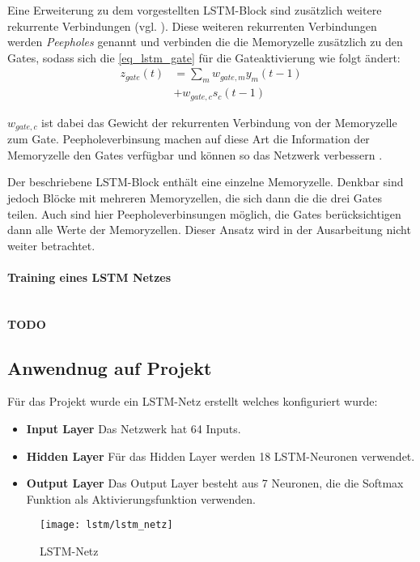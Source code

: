 Eine Erweiterung zu dem vorgestellten \ac{LSTM}-Block sind zusätzlich weitere
rekurrente Verbindungen (vgl. \cite{Gers2002b}). Diese weiteren rekurrenten
Verbindungen werden \textit{Peepholes} genannt und verbinden die die Memoryzelle
zusätzlich zu den Gates, sodass sich die \autoref{eq_lstm_gate} für die Gateaktivierung
wie folgt ändert:
\begin{equation}
\label{eq_lstm_gate_peephole}
\begin{split}
z_{gate}(t) &= \sum \limits_{m} w_{gate,m}y_m(t-1) \\
			&+ w_{gate,c} s_c(t-1)
\end{split}
\end{equation}

$w_{gate,c}$ ist dabei das Gewicht der rekurrenten Verbindung von der
Memoryzelle zum Gate. Peepholeverbinsung machen auf diese Art die Information
der Memoryzelle den Gates verfügbar und können so das Netzwerk verbessern
\cite{Gers2002b}. 

Der beschriebene \ac{LSTM}-Block enthält eine einzelne Memoryzelle. Denkbar sind
jedoch Blöcke mit mehreren Memoryzellen, die sich dann die die drei Gates
teilen. Auch sind hier Peepholeverbinsungen möglich, die Gates berücksichtigen
dann alle Werte der Memoryzellen. Dieser Ansatz wird in der Ausarbeitung nicht
weiter betrachtet. 

\paragraph{Training eines \ac{LSTM} Netzes}\\
\textbf{TODO}

\subsection{Anwendnug auf Projekt}
Für das Projekt wurde ein LSTM-Netz erstellt welches konfiguriert wurde:

\begin{itemize}
\item \textbf{Input Layer} Das Netzwerk hat 64 Inputs.
\item \textbf{Hidden Layer} Für das Hidden Layer werden 18 LSTM-Neuronen verwendet.
\item \textbf{Output Layer} Das Output Layer besteht aus 7 Neuronen, die die 
Softmax Funktion als Aktivierungsfunktion verwenden.
\end{itemize}

\begin{figure}[htbp]
    \centering
   \texttt{[image: lstm/lstm\_netz]}
\caption{LSTM-Netz}
\label{fig:lstm_netz}
\end{figure}


